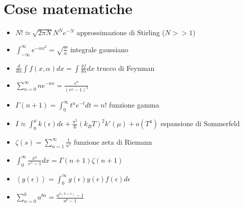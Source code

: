 \documentclass[a4paper]{article}
\begin{document}
    \section{Cose matematiche}
        \begin{itemize}
            \item $N!\simeq\sqrt{2\pi N}N^Ne^{-N}$ approssimazione di Stirling ($N>>1$)
            \item $\int_{-\infty}^{\infty}e^{-\alpha x^2}=\sqrt{\frac{\pi}{\alpha}}$ integrale gaussiano
            \item $\frac{d}{d\alpha}\int f(x,\alpha)dx=\int\frac{\delta f}{\delta\alpha}dx$ trucco di Feynman
            \item $\sum_{n=0}^\infty ne^{-an}=\frac{e^a}{(e^a-1)^2}$
            \item $\Gamma(n+1)=\int_0^\infty t^{n}e^{-t}dt=n!$ funzione gamma
            \item $I\approx\int_0^\mu k(\epsilon)d\epsilon+\frac{\pi^2}{6}(k_BT)^2k'(\mu)+o(T^4)$ espansione di Sommerfeld
            \item $\zeta(s)=\sum_{n=1}^\infty\frac{1}{n^s}$ funzione zeta di Riemann
            \item $\int_0^\infty\frac{x^n}{e^x-1}dx=\Gamma(n+1)\zeta(n+1)$
            \item $\left\langle y(\epsilon) \right\rangle=\int_0^\infty g(\epsilon)y(\epsilon)f(\epsilon)d\epsilon$
            \item $\sum_{n=0}^{k}a^{bn}=\frac{a^{b(k+1)}-1}{a^b-1}$
        \end{itemize}
\end{document}
